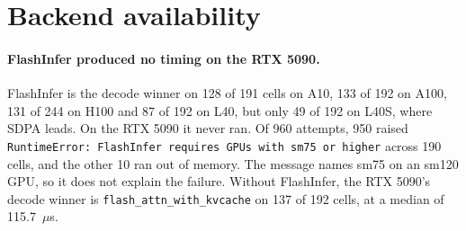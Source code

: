 \documentclass[11pt]{article}
\newcommand{\us}{\ensuremath{\mu}s}
\newcommand{\code}[1]{\texttt{\small #1}}
\begin{document}
\begin{table}[tb]
\centering
\small
\setlength{\tabcolsep}{1.5pt}
\caption{Winner-change rate pooled over GPU pairs. \emph{Ampere/Ada/Hopper} is
the ten pairs among A10, A100, L40, L40S and H100, and \emph{RTX 5090 pairs} is
the five pairs with the RTX 5090. \emph{n} is the number of pair comparisons and
\emph{changed} the share with a different winner. The right columns keep only
configurations separated on both GPUs. Intervals are a 2000-draw cluster
bootstrap over configurations, since one configuration appears in several
pairs.}
\label{tab:flips}
\end{table}

\section{Backend availability}
\label{sec:mech}

\paragraph{FlashInfer produced no timing on the RTX 5090.} FlashInfer is the
decode winner on 128 of 191 cells on A10, 133 of 192 on A100, 131 of 244 on H100
and 87 of 192 on L40, but only 49 of 192 on L40S, where SDPA leads. On the
RTX 5090 it never ran. Of 960 attempts, 950 raised \code{RuntimeError:
FlashInfer requires GPUs with sm75 or higher} across 190 cells, and the other
10 ran out of memory. The message names sm75 on an sm120 GPU, so it does not
explain the failure. Without FlashInfer, the RTX 5090's decode winner is
\code{flash\_attn\_with\_kvcache} on 137 of 192 cells, at a median of
115.7~\us{}.
\end{document}
